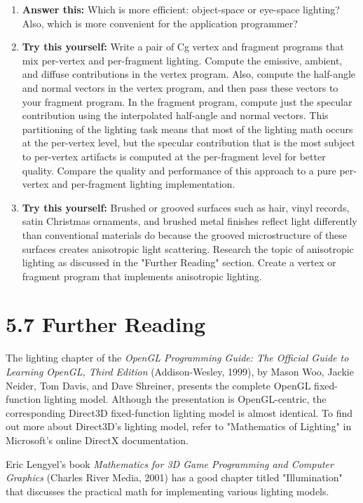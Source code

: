 \documentclass[../main.tex]{subfiles}
\begin{document}
\begin{enumerate}
\item \textbf{Answer this:} Which is more efficient: object-space or eye-space lighting? Also, which is more convenient for the application programmer?

\item \textbf{Try this yourself:} Write a pair of Cg vertex and fragment programs that mix per-vertex and per-fragment lighting. Compute the emissive, ambient, and diffuse contributions in the vertex program. Also, compute the half-angle and normal vectors in the vertex program, and then pass these vectors to your fragment program. In the fragment program, compute just the specular contribution using the interpolated half-angle and normal vectors. This partitioning of the lighting task means that most of the lighting math occurs at the per-vertex level, but the specular contribution that is the most subject to per-vertex artifacts is computed at the per-fragment level for better quality. Compare the quality and performance of this approach to a pure per-vertex and per-fragment lighting implementation.

\item \textbf{Try this yourself:} Brushed or grooved surfaces such as hair, vinyl records, satin Christmas ornaments, and brushed metal finishes reflect light differently than conventional materials do because the grooved microstructure of these surfaces creates anisotropic light scattering. Research the topic of anisotropic lighting as discussed in the "Further Reading" section. Create a vertex or fragment program that implements anisotropic lighting.

\end{enumerate}

\section{5.7 Further Reading}

The lighting chapter of the \textit{OpenGL Programming Guide: The Official Guide to Learning OpenGL, Third Edition} (Addison-Wesley, 1999), by Mason Woo, Jackie Neider, Tom Davis, and Dave Shreiner, presents the complete OpenGL fixed-function lighting model. Although the presentation is OpenGL-centric, the corresponding Direct3D fixed-function lighting model is almost identical. To find out more about Direct3D's lighting model, refer to "Mathematics of Lighting" in Microsoft's online DirectX documentation.

Eric Lengyel's book \textit{Mathematics for 3D Game Programming and Computer Graphics} (Charles River Media, 2001) has a good chapter titled "Illumination" that discusses the practical math for implementing various lighting models.
\end{document}
